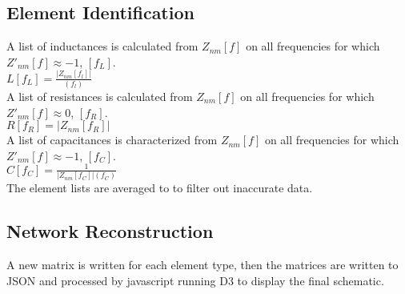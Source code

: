 \documentclass[11pt,twoside]{mitthesis}
\begin{document}
\subsection{Element Identification}
A list of inductances is calculated from $Z_{nm}[f]$ on all frequencies for which $Z'_{nm}[f]\approx-1$, $[f_L]$.\\
$\displaystyle L[f_L] = \frac{|Z_{nm}[f_l]|}{(f_l)}$\\
A list of resistances is calculated from $Z_{nm}[f]$ on all frequencies for which $Z'_{nm}[f]\approx0$, $[f_R]$.\\
$\displaystyle R[f_R] = |Z_{nm}[f_R]|$\\
A list of capacitances is characterized from $Z_{nm}[f]$ on all frequencies for which $Z'_{nm}[f]\approx-1$, $[f_C]$.\\
$\displaystyle C[f_C] = \frac{1}{|Z_{nm}[f_C]|(f_C)}$\\

The element lists are averaged to to filter out inaccurate data.

\subsection{Network Reconstruction}

A new matrix is written for each element type, then the matrices are written to JSON and processed by javascript running D3 to display the final schematic.

\ifdefined\DEBUG
\end{document}
